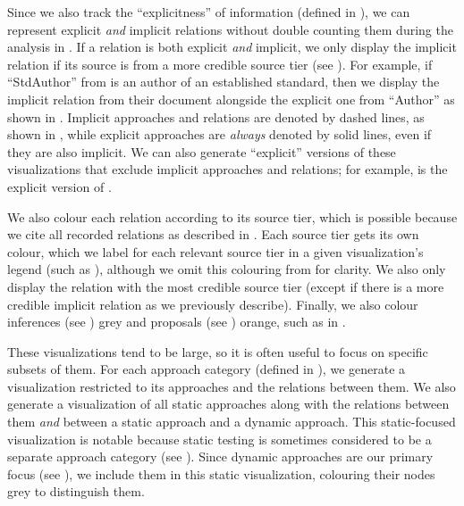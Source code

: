     
    \ExampleSynGraph{}

    \label{visExplicit}
    Since we also track the ``explicitness'' of information (defined in
    ), we can represent explicit \emph{and} implicit
    relations without double counting them during the analysis in
    . If a relation is both explicit \emph{and} implicit,
    we only display the implicit relation if its source is from a more
    credible source tier (see ). For example, if
    ``StdAuthor'' from  is an author of an
    established standard, then we display the implicit relation from their
    document alongside the explicit one from ``Author'' as shown in
    .
    Implicit approaches and relations are denoted by dashed lines, as shown in
    , while explicit approaches are
    \emph{always} denoted by solid lines, even if they are also implicit. We
    can also generate ``explicit'' versions of these visualizations that exclude
    implicit approaches and relations; for example, 
    is the explicit version of . %

    We also colour each relation according to its source tier, which is
    possible because we cite all recorded relations as described in
    . Each source tier gets its own colour, which we label
    for each relevant source tier in a given visualization's legend
    (such as ), although we omit this
    colouring from  for
    clarity. We also only display the relation with the most credible source
    tier (except if there is a more credible implicit relation as we previously
    describe). Finally, we also colour inferences (see ) grey and
    proposals (see ) orange, such as in \recFigs{}.

\fi
These visualizations tend to be large, so it is often useful to focus on
specific subsets of them. \ifnotpaper For each approach category (defined in
    ), we generate a visualization restricted to its approaches
    and the relations between them. We also generate a visualization of all static
    approaches along with the relations between them \emph{and} between a
    static approach and a dynamic approach. This static-focused visualization is
    notable because static testing is sometimes considered to be a separate
    approach category (see ). Since dynamic
    approaches are our primary focus (see ), we include them
    in this static visualization, colouring their nodes grey to distinguish them.

